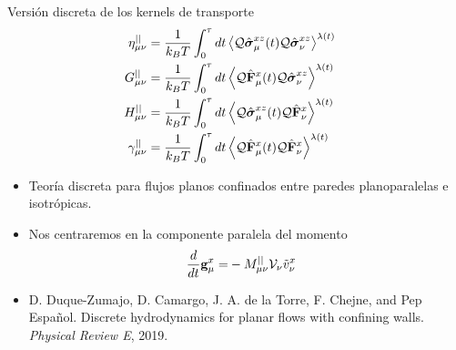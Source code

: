 \documentclass{beamer}
\begin{document}
\begin{frame}{Versión discreta de los kernels de transporte}
\begin{align}
\eta^{||}_{\mu\nu}&
=\frac{1}{k_BT}\int_0^\tau  dt\left\langle 
{\cal Q}\hat{\boldsymbol{\sigma}}^{xz}_\mu(t){\cal Q}\hat{\boldsymbol{\sigma}}^{xz}_\nu
  \right\rangle^{\lambda(t)}&&
\nonumber\\
G^{||}_{\mu\nu}&
=\frac{1}{k_BT} \int_0^\tau  dt
\left\langle{\cal Q}\hat{\bf F}^{x}_\mu(t)
{\cal Q}\hat{\boldsymbol{\sigma}}^{xz}_\nu
\right\rangle^{\lambda(t)}&&
\nonumber\\
H^{||}_{\mu\nu}&
=\frac{1}{k_BT} 
\int_0^\tau  dt
\left\langle{\cal Q}\hat{\boldsymbol{\sigma}}^{xz}_\mu(t){\cal Q}\hat{\bf F}^{x}_\nu\right\rangle^{\lambda(t)}&&
\nonumber\\
\gamma^{||}_{\mu\nu}&=
\frac{1}{k_BT} \int_0^\tau  dt
\left\langle 
{\cal Q}\hat{\bf F}^{x}_\mu(t)
{\cal Q}\hat{\bf F}^{x}_\nu\right\rangle^{\lambda(t)}&&
\nonumber
\end{align}
\end{frame}


\begin{frame}
  \begin{itemize}
    \item<1-> \alert{Teoría discreta} para flujos planos confinados entre paredes planoparalelas e isotrópicas.
    \item<2-> Nos centraremos en la {componente paralela} del momento   
\begin{align}
  \frac{d}{dt}{{\bf g}}^x_\mu=&-M_{\mu\nu}^{||}{\cal V}_\nu\tilde{v}^x_\nu
\nonumber
\end{align}
    \item<3-> D. Duque-Zumajo, D. Camargo, J. A. de la Torre, F. Chejne, and Pep Espa\~nol. Discrete hydrodynamics for planar flows with confining walls. \textit{Physical Review E}, 2019.
  \end{itemize}

\end{frame}
\end{document}
